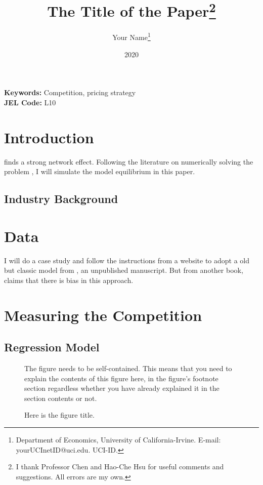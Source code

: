 \documentclass[12pt, letterpaper, oneside]{article}
\title{The Title of the Paper\thanks{I thank Professor Chen and Hao-Che Hsu for useful comments and suggestions. All errors are my own.}}
\author{Your Name\footnote{Department of Economics, University of California-Irvine. E-mail: yourUCInetID@uci.edu. UCI-ID.}}
\date{2020}
\begin{document}
\doublespacing
\maketitle

\begin{abstract}
    \lipsum[30]
\end{abstract}

\noindent\textbf{Keywords:} Competition, pricing strategy\\

\noindent\textbf{JEL Code:} L10
\newpage

\section{Introduction}
\cite{chen2018} finds a strong network effect. Following the literature on numerically solving the problem \citep{chen2018}, I will simulate the model equilibrium in this paper. \lipsum[31-32]

\subsection{Industry Background}
\lipsum[33]

\section{Data}
I will do a case study and follow the instructions from a website \citep{web-io} to adopt a old but classic model from \cite{art}, an unpublished manuscript. But from another book, \cite{book-tirole} claims that there is bias in this approach. \lipsum[34-35]

\section{Measuring the Competition}
\lipsum[36]

\subsection{Regression Model}
\lipsum[43]

\begin{figure}[h!]
    \centering
    \caption{Here is the figure title.}
    \vspace*{-0.2cm}
    \fbox{\rule[-.5cm]{0cm}{4cm} \rule[-.5cm]{10cm}{0cm}}
    \begin{minipage}{0.63\textwidth}
        \vspace{0.15cm}
        {\footnotesize  The figure needs to be \lquote self-contained\rquote. This means that you need to explain the contents of this figure here, in the figure's footnote section regardless whether you have already explained it in the section contents or not.}
    \end{minipage}
\end{figure}
\end{document}
